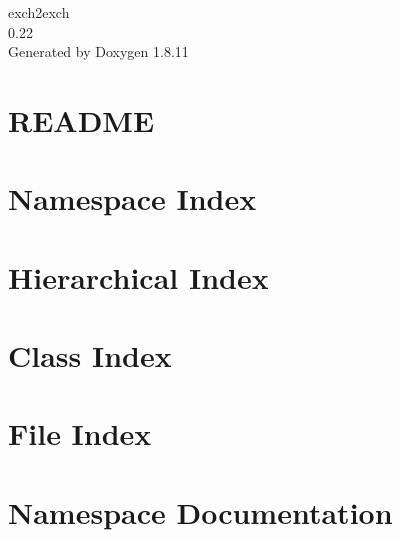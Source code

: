 \documentclass[twoside]{book}
\newcommand{\+}{\discretionary{\mbox{\scriptsize$\hookleftarrow$}}{}{}}
\newcommand{\clearemptydoublepage}{%
  \newpage{\pagestyle{empty}\cleardoublepage}%
}
\begin{document}
\hypersetup{pageanchor=false,
             bookmarksnumbered=true,
             pdfencoding=unicode
            }
\begin{titlepage}
\vspace*{7cm}
\begin{center}%
{\Large exch2exch \\[1ex]\large 0.\+22 }\\
\vspace*{1cm}
{\large Generated by Doxygen 1.8.11}\\
\end{center}
\end{titlepage}
\clearemptydoublepage
\tableofcontents
\clearemptydoublepage
{}
\hypersetup{pageanchor=true}

\chapter{R\+E\+A\+D\+ME}
\label{md__home_hilton_github_exch2exh_README}
\hypertarget{md__home_hilton_github_exch2exh_README}{}

\chapter{Namespace Index}

\chapter{Hierarchical Index}

\chapter{Class Index}

\chapter{File Index}

\chapter{Namespace Documentation}







\end{document}
